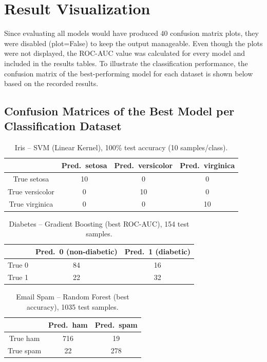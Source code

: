 \documentclass[12pt,a4paper]{article}
\begin{document}
\section{Result Visualization}
Since evaluating all models would have produced 40 confusion matrix plots, they were disabled (plot=False) to keep the output manageable. Even though the plots were not displayed, the ROC-AUC value was calculated for every model and included in the results tables. To illustrate the classification performance, the confusion matrix of the best-performing model for each dataset is shown below based on the recorded results.
 
\subsection{Confusion Matrices of the Best Model per Classification Dataset}
\begin{table}[H]
\centering
\caption{Iris -- SVM (Linear Kernel), 100\% test accuracy (10 samples/class).}
\begin{tabular}{c|ccc}
 & Pred.\ setosa & Pred.\ versicolor & Pred.\ virginica \\
\hline
True setosa & 10 & 0 & 0 \\
True versicolor & 0 & 10 & 0 \\
True virginica & 0 & 0 & 10 \\
\end{tabular}
\end{table}
 
\begin{table}[H]
\centering
\caption{Diabetes -- Gradient Boosting (best ROC-AUC), 154 test samples.}
\begin{tabular}{c|cc}
 & Pred.\ 0 (non-diabetic) & Pred.\ 1 (diabetic) \\
\hline
True 0 & 84 & 16 \\
True 1 & 22 & 32 \\
\end{tabular}
\end{table}
 
\begin{table}[H]
\centering
\caption{Email Spam -- Random Forest (best accuracy), 1035 test samples.}
\begin{tabular}{c|cc}
 & Pred.\ ham & Pred.\ spam \\
\hline
True ham & 716 & 19 \\
True spam & 22 & 278 \\
\end{tabular}
\end{table}
 
\end{document}
